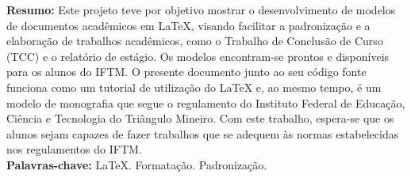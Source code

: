 \begin{singlespace}
\textbf{Resumo: }
Este projeto teve por objetivo mostrar o desenvolvimento de modelos de documentos acadêmicos em LaTeX, visando facilitar a padronização e a elaboração de trabalhos acadêmicos, como o Trabalho de Conclusão de Curso (TCC) e o relatório de estágio. Os modelos encontram-se prontos e disponíveis para os alunos do IFTM. O presente documento junto ao seu código fonte funciona como um tutorial de utilização do LaTeX e, ao mesmo tempo, é um modelo de monografia que segue o regulamento do Instituto Federal de Educação, Ciência e Tecnologia do Triângulo Mineiro. Com este trabalho, espera-se que os alunos sejam capazes de fazer trabalhos que se adequem às normas estabelecidas nos regulamentos do IFTM.\\
\textbf{Palavras-chave: }
LaTeX. Formatação. Padronização.
\end{singlespace}
